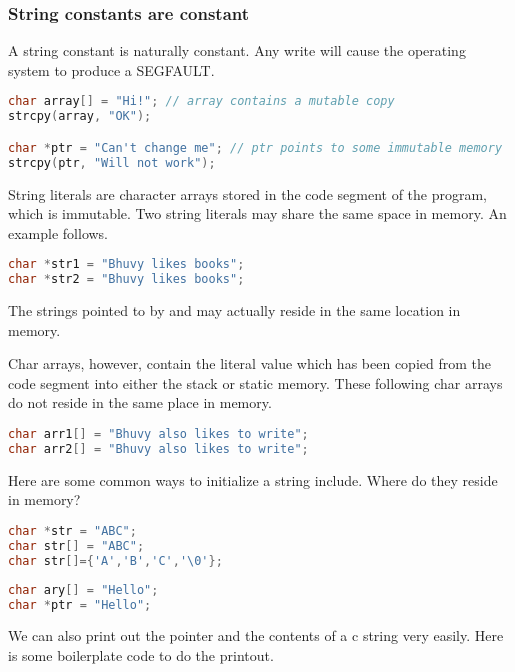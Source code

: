 \subsubsection{String constants are constant}

A string constant is naturally constant.
Any write will cause the operating system to produce a SEGFAULT.

\begin{lstlisting}[language=C]
char array[] = "Hi!"; // array contains a mutable copy
strcpy(array, "OK");

char *ptr = "Can't change me"; // ptr points to some immutable memory
strcpy(ptr, "Will not work");
\end{lstlisting}

String literals are character arrays stored in the code segment of the program, which is immutable.
Two string literals may share the same space in memory.
An example follows.

\begin{lstlisting}[language=C]
char *str1 = "Bhuvy likes books";
char *str2 = "Bhuvy likes books";
\end{lstlisting}

The strings pointed to by  and  may actually reside in the same location in memory.

Char arrays, however, contain the literal value which has been copied from the code segment into either the stack or static memory.
These following char arrays do not reside in the same place in memory.

\begin{lstlisting}[language=C]
char arr1[] = "Bhuvy also likes to write";
char arr2[] = "Bhuvy also likes to write";
\end{lstlisting}

Here are some common ways to initialize a string include. Where do they reside in memory?

\begin{lstlisting}[language=C]
char *str = "ABC";
char str[] = "ABC";
char str[]={'A','B','C','\0'};
\end{lstlisting}

\begin{lstlisting}[language=C]
char ary[] = "Hello";
char *ptr = "Hello";
\end{lstlisting}

We can also print out the pointer and the contents of a c string very easily. Here is some boilerplate code to do the printout.

